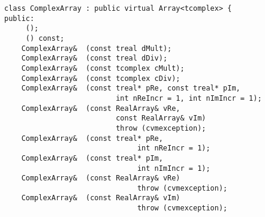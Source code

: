 \bigskip
\noindent
\verb"class ComplexArray : public virtual Array<tcomplex> {"\\
\verb"public:"\\
\verb"    "\verb" ();"\\
\verb"    "\verb" () const;"\\
\verb"    ComplexArray& "\verb" (const treal dMult);"\\
\verb"    ComplexArray& "\verb" (const treal dDiv);"\\
\verb"    ComplexArray& "\verb" (const tcomplex cMult);"\\
\verb"    ComplexArray& "\verb" (const tcomplex cDiv);"\\
\verb"    ComplexArray& "\verb" (const treal* pRe, const treal* pIm,"\\
\verb"                          int nReIncr = 1, int nImIncr = 1);"\\
\verb"    ComplexArray& "\verb" (const RealArray& vRe,"\\
\verb"                          const RealArray& vIm)"\\
\verb"                          throw (cvmexception);"\\
\verb"    ComplexArray& "\verb" (const treal* pRe,"\\
\verb"                               int nReIncr = 1);"\\
\verb"    ComplexArray& "\verb" (const treal* pIm,"\\
\verb"                               int nImIncr = 1);"\\
\verb"    ComplexArray& "\verb" (const RealArray& vRe)"\\
\verb"                               throw (cvmexception);"\\
\verb"    ComplexArray& "\verb" (const RealArray& vIm)"\\
\verb"                               throw (cvmexception);"\\
